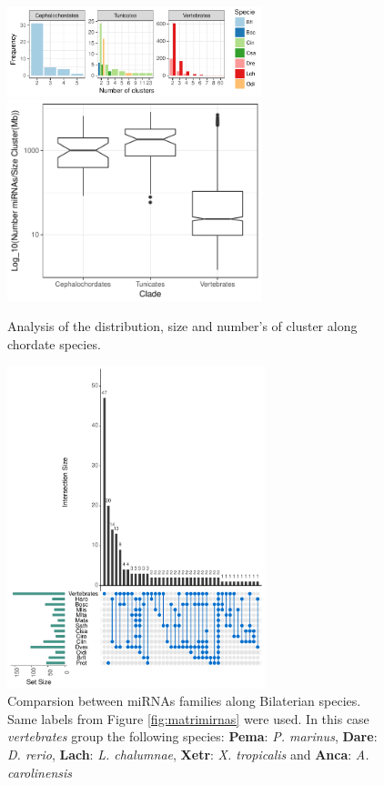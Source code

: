 \documentclass[graybox]{svmult}
\begin{document}
\begin{figure}[t]
\sidecaption[t]
\includegraphics[width=7.4cm]{./Images/cluster_number.pdf} \\ 
\includegraphics[width=7.4cm]{./Images/density.pdf} 
\caption{Analysis of the distribution, size and number's of cluster along 
chordate species.}
\label{fig:sizeCluster}
\end{figure}

\begin{figure}[t]
\sidecaption[t]
\includegraphics[width=7.5cm]{./Images/vennmiRNAs}
\caption{Comparsion between miRNAs families along Bilaterian species. Same 
labels from Figure \ref{fig:matrimirnas} were used. In this case 
\textsl{vertebrates} group the following species: \textbf{Pema}: \textit{P. 
marinus}, \textbf{Dare}: \textit{D. rerio}, \textbf{Lach}: \textit{L. 
chalumnae}, \textbf{Xetr}: \textit{X. tropicalis} and \textbf{Anca}: \textit{A. 
carolinensis}}
\label{fig:vennDiagram}
\end{figure}
\end{document}
